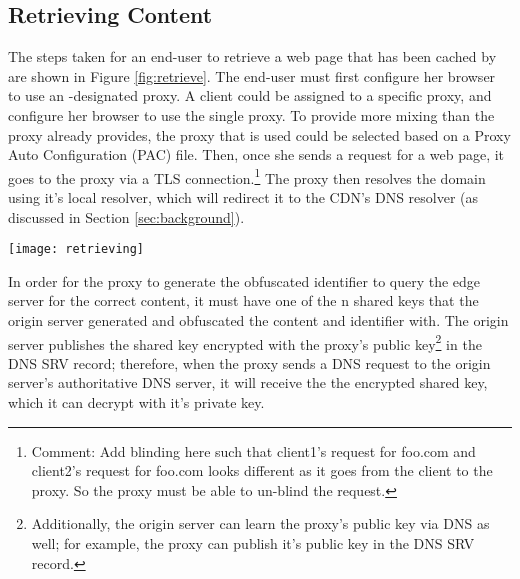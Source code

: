 \subsection{Retrieving Content}
\label{sec:retrieve}
The steps taken for an end-user to retrieve a web page that has been cached by \system{} are shown in Figure \ref{fig:retrieve}.  
The end-user must first configure her browser to use an \system{}-designated proxy.  A client could be assigned to a 
specific proxy, and configure her browser to use the single proxy.  To provide more mixing than the proxy already provides, 
the proxy that is used could be selected based 
on a Proxy Auto Configuration (PAC) file.  Then, once she sends a request for a 
web page, it goes to the proxy via a TLS connection.\footnote{Comment: Add blinding here such that client1's request for foo.com and 
client2's request for foo.com looks different as it goes from the client to the proxy.  So the proxy must be able to un-blind 
the request.}  The proxy then resolves the domain using it's local resolver, which will 
redirect it to the CDN's DNS resolver (as discussed in Section \ref{sec:background}). 

\begin{figure*}[t]
\centering
\texttt{[image: retrieving]}
\caption{Steps taken to retrieve a web page using \system{}.}
\label{fig:retrieve}
\end{figure*}

In order for the proxy to generate the obfuscated identifier to query the edge server for the correct content, 
it must have one of the n shared keys that the origin server generated and obfuscated the content and identifier 
with.  The origin server publishes the shared key encrypted with the proxy's public key\footnote{Additionally, the origin server 
can learn the proxy's public key via DNS as well; for example, the proxy can publish it's public key in the DNS SRV record.} in the DNS SRV record; therefore, 
when the proxy sends a DNS request to the origin server's authoritative DNS server, it will receive the the encrypted shared 
key, which it can decrypt with it's private key.  

